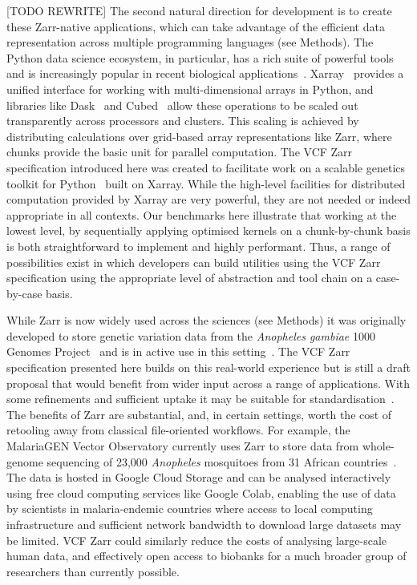 \documentclass[a4paper,num-refs]{oup-contemporary}
\begin{document}
[TODO REWRITE]
The second natural direction for development is to create
these Zarr-native applications, which can take advantage
of the efficient data representation
across multiple programming languages (see Methods).
The Python data science ecosystem, in particular,
has a rich suite of powerful tools~\cite[e.g.][]{
mckinney2010data,
lam2015numba,
kluyver2016jupyter,
harris2020array,
virtanen2020scipy} 
and is increasingly
popular in recent biological applications~\citep[e.g.][]{
abdennur2020cooler,
rand2022bionumpy,
open2c2024bioframe,
hou2024admix}.
Xarray~\cite{hoyer2017xarray} provides a unified interface for working 
with multi-dimensional arrays
in Python, and libraries like Dask~\cite{rocklin2015dask}  
and Cubed~\cite{cubed2024} allow these operations to be
scaled out transparently across processors and clusters. 
This scaling is achieved by distributing calculations over 
grid-based array representations like Zarr, where chunks
provide the basic unit for parallel computation.
The VCF Zarr specification introduced here was created 
to facilitate work on a scalable genetics toolkit for 
Python~\cite{sgkit2024} built on Xarray. 
While the high-level facilities for distributed 
computation provided by Xarray 
are very powerful, they are not needed or indeed
appropriate in all contexts. Our benchmarks here 
illustrate that working at the lowest level, 
by sequentially applying optimised kernels on a chunk-by-chunk
basis is both straightforward to implement and highly performant.
Thus, a range of possibilities exist in which developers 
can build utilities using the VCF Zarr specification
using the appropriate level of abstraction and tool chain
on a case-by-case basis.

While Zarr is now widely used across the sciences (see Methods)
it was originally 
developed to store genetic variation data from the 
\textit{Anopheles gambiae} 
1000 Genomes Project~\citep{anopheles2017genetic}
and is in active use in this 
setting~\cite[e.g.][]{ahouidi2021open,trimarsanto2022molecular}.
The VCF Zarr specification presented here builds on this real-world 
experience but is still a draft proposal that would benefit 
from wider input across a range of applications. With some 
refinements and sufficient uptake it may be suitable 
for standardisation~\cite{rehm2021ga4gh}.
The benefits of Zarr are substantial, and, in certain settings,
worth the cost of retooling away from classical file-oriented workflows.
For example, the MalariaGEN Vector Observatory
currently uses Zarr to store data from whole-genome sequencing 
of 23,000 \textit{Anopheles} mosquitoes from 31 African 
countries~\cite{mvgo2024}.
The data is hosted in Google Cloud Storage and can be analysed interactively
using free cloud computing services like Google Colab,
enabling the use of data by scientists in malaria-endemic countries
where access to local computing infrastructure and sufficient network 
bandwidth to download large datasets may be limited.
VCF Zarr could similarly reduce the costs of analysing large-scale
human data, and effectively open access to biobanks
for a much broader group of researchers than currently possible.
\end{document}
